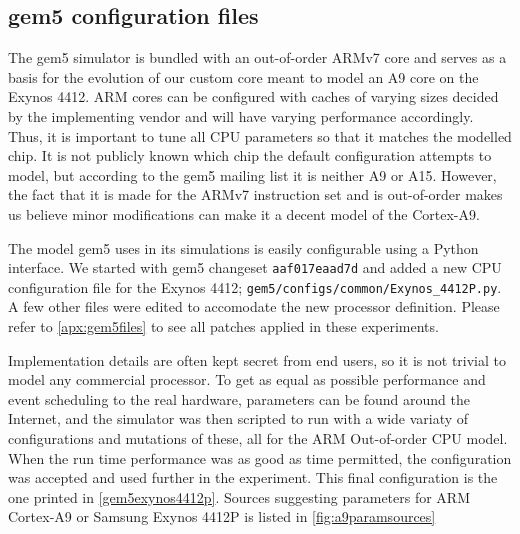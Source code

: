 \subsection{gem5 configuration files}
The gem5 simulator is bundled with an out-of-order ARMv7 core and serves as a
basis for the evolution of our custom core meant to model an A9 core on the
Exynos 4412. ARM cores can be configured with caches of varying sizes decided
by the implementing vendor and will have varying performance accordingly. Thus,
it is important to tune all CPU parameters so that it matches the modelled chip.
It is not publicly known which chip the default configuration attempts to model,
but according to the gem5 mailing list \cite{a15maillist} it is neither A9 or
A15. However, the fact that it is made for the ARMv7 instruction set and is
out-of-order makes us believe minor modifications can make it a decent model of
the Cortex-A9.

The model gem5 uses in its simulations is easily configurable using a Python
interface. We started with gem5 changeset \texttt{aaf017eaad7d} and added a new
CPU configuration file for the Exynos 4412;
\texttt{gem5/configs/common/Exynos\_4412P.py}. A few other files were edited to
accomodate the new processor definition. Please refer to
\autoref{apx:gem5files} to see all patches applied in these experiments.

Implementation details are often kept secret from end users, so it is not
trivial to model any commercial processor. To get as equal as possible
performance and event scheduling to the real hardware, parameters can be found
around the Internet, and the simulator was then scripted to run with a wide
variaty of configurations and mutations of these, all for the ARM Out-of-order
CPU model. When the run time performance was as good as time permitted, the
configuration was accepted and used further in the experiment.  This final
configuration is the one printed in \autoref{gem5exynos4412p}. Sources
suggesting parameters for ARM Cortex-A9 or Samsung Exynos 4412P is listed in
\autoref{fig:a9paramsources}

